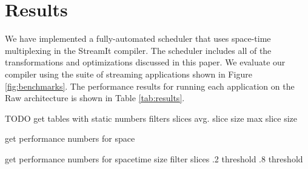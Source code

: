 \section{Results}
\label{sec:results}

We have implemented a fully-automated scheduler that uses space-time
multiplexing in the StreamIt compiler.  The scheduler includes all of
the transformations and optimizations discussed in this paper.  We
evaluate our compiler using the suite of streaming applications shown
in Figure \ref{fig:benchmarks}.  The performance results for running
each application on the Raw architecture is shown in Table
\ref{tab:results}.


TODO
get tables with static numbers
	filters
	slices
	avg. slice size
	max slice size

get performance numbers for space

get performance numbers for spacetime 
	size filter slices
	.2 threshold
	.8 threshold
